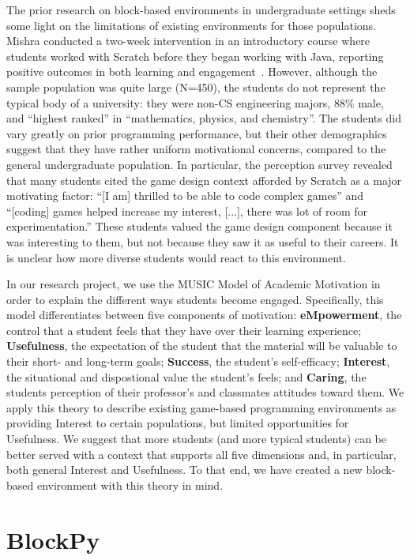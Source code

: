 \documentclass[conference]{IEEEtran}
\begin{document}
The prior research on block-based environments in undergraduate settings sheds some light on the limitations of existing environments for those populations.
Mishra conducted a two-week intervention in an introductory course where students worked with Scratch before they began working with Java, reporting positive outcomes in both learning and engagement~\cite{Mishra}.
However, although the sample population was quite large (N=450), the students do not represent the typical body of a university: they were non-CS engineering majors, 88\% male, and ``highest ranked'' in ``mathematics, physics, and chemistry''.
The students did vary greatly on prior programming performance, but their other demographics suggest that they have rather uniform motivational concerns, compared to the general undergraduate population.
In particular, the perception survey revealed that many students cited the game design context afforded by Scratch as a major motivating factor: ``[I am] thrilled to be able to code complex games'' and ``[coding] games helped increase my interest, [...], there was lot of room for experimentation.''
These students valued the game design component because it was interesting to them, but not because they saw it as useful to their careers.
It is unclear how more diverse students would react to this environment.

In our research project, we use the MUSIC Model of Academic Motivation\cite{jones-description} in order to explain the different ways students become engaged. Specifically, this model differentiates between five components of motivation: \textbf{eMpowerment}, the control that a student feels that they have over their learning experience; \textbf{Usefulness}, the expectation of the student that the material will be valuable to their short- and long-term goals; \textbf{Success}, the student's self-efficacy; \textbf{Interest}, the situational and dispostional value the student's feels; and \textbf{Caring}, the students perception of their professor's and classmates attitudes toward them.
We apply this theory to describe existing game-based programming environments as providing Interest to certain populations, but limited opportunities for Usefulness.
We suggest that more students (and more typical students) can be better served with a context that supports all five dimensions and, in particular, both general Interest and Usefulness.
To that end, we have created a new block-based environment with this theory in mind.

\section{BlockPy}
	
\end{document}
